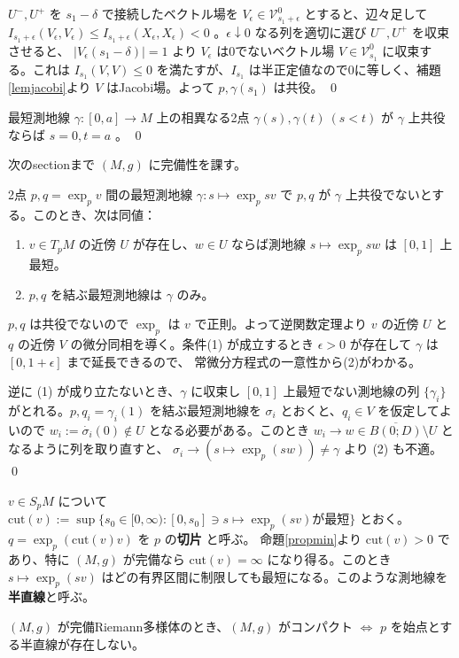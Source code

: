 \documentclass[dvipdfmx,a4paper]{jsreport}
\theoremstyle{definition}
\renewcommand{\bar}{\overline}
\begin{document}
$U^-,U^+$ を $s_1-\delta$ で接続したベクトル場を $V_\epsilon \in \mathcal{V}^0_{s_1+\epsilon}$ とすると、辺々足して $I_{s_1+\epsilon}(V_\epsilon,V_\epsilon) \leq I_{s_1+\epsilon}(X_\epsilon,X_\epsilon)<0$ 。$\epsilon \downarrow 0$ なる列を適切に選び $U^-,U^+$ を収束させると、 $|V_\epsilon(s_1-\delta)|=1$ より $V_\epsilon$ は0でないベクトル場 $V \in \mathcal{V}^0_{s_1}$ に収束する。これは $I_{s_1}(V,V) \leq 0$ を満たすが、$I_{s_1}$ は半正定値なので0に等しく、補題\ref{lemjacobi}より $V$ はJacobi場。よって $p,\gamma(s_1)$ は共役。
\qed

\cor\label{corminimal} 最短測地線 $\gamma:[0,a] \to M$ 上の相異なる2点 $\gamma(s),\gamma(t)\ (s<t)$ が $\gamma$ 上共役ならば $s=0,t=a$ 。 \qed

次のsectionまで $(M,g)$ に完備性を課す。

\lem\label{lemnbhd} 2点 $p,q=\exp_p v$ 間の最短測地線 $\gamma:s \mapsto \exp_p sv$ で $p,q$ が $\gamma$ 上共役でないとする。このとき、次は同値：
\begin{enumerate}
    \item $v \in T_pM$ の近傍 $U$ が存在し、$w \in U$ ならば測地線 $s \mapsto \exp_p sw$ は $[0,1]$ 上最短。
    \item $p,q$ を結ぶ最短測地線は $\gamma$ のみ。
\end{enumerate}

\prf $p,q$ は共役でないので $\exp_p$ は $v$ で正則。よって逆関数定理より $v$ の近傍 $U$ と $q$ の近傍 $V$ の微分同相を導く。条件(1) が成立するとき $\epsilon>0$ が存在して $\gamma$ は $[0,1+\epsilon]$ まで延長できるので、
常微分方程式の一意性から(2)がわかる。

逆に (1) が成り立たないとき、$\gamma$ に収束し $[0,1]$ 上最短でない測地線の列 $\{\gamma_i\}$ がとれる。$p,q_i=\gamma_i(1)$ を結ぶ最短測地線を $\sigma_i$ とおくと、$q_i \in V$ を仮定してよいので $w_i:=\dot{\sigma_i}(0) \notin U$ となる必要がある。このとき $w_i \to w \in \bar{B(0;D)} \setminus U$ となるように列を取り直すと、 $\sigma_i \to (s \mapsto \exp_p(sw)) \neq \gamma$ より (2) も不適。 \qed

 $v \in S_pM$ について $\mbox{cut}(v):=\sup\{s_0 \in [0,\infty) \colon [0,s_0] \ni s \mapsto \exp_p(sv)\mbox{が最短}\}$  とおく。$q=\exp_p(\mbox{cut}(v)v)$ を $p$ の\textbf{切片} と呼ぶ。 命題\ref{propmin}より $\mbox{cut}(v)>0$ であり、特に $(M,g)$ が完備なら $\mbox{cut}(v)=\infty$ になり得る。このとき $s \mapsto \exp_p(sv)$ はどの有界区間に制限しても最短になる。このような測地線を\textbf{半直線}と呼ぶ。

\lem $(M,g)$ が完備Riemann多様体のとき、$(M,g)$ がコンパクト $\iff$ $p$ を始点とする半直線が存在しない。
\end{document}
